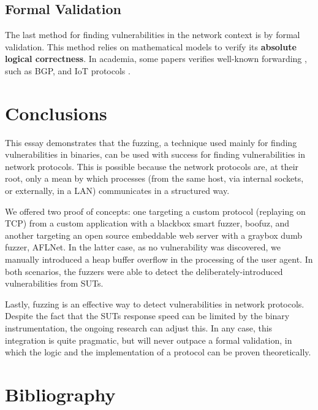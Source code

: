 \documentclass[10pt,a4paper,english,onecolumn]{IEEEtran}
\begin{document}
\subsection{Formal Validation}

The last method for finding vulnerabilities in the network context is by formal validation. This method relies on mathematical models to verify its \textbf{absolute logical correctness}. In academia, some papers verifies well-known forwarding \cite{formal_verification_bgp}, such as BGP, and IoT protocols \cite{formal_verification_iot}.

\section{Conclusions}

This essay demonstrates that the fuzzing, a technique used mainly for finding vulnerabilities in binaries, can be used with success for finding vulnerabilities in network protocols. This is possible because the network protocols are, at their root, only a mean by which processes (from the same host, via internal sockets, or externally, in a LAN) communicates in a structured way.

We offered two proof of concepts: one targeting a custom protocol (replaying on TCP) from a custom application with a blackbox smart fuzzer, boofuz, and another targeting an open source embeddable web server with a graybox dumb fuzzer, AFLNet. In the latter case, as no vulnerability was discovered, we manually introduced a heap buffer overflow in the processing of the user agent. In both scenarios, the fuzzers were able to detect the deliberately-introduced vulnerabilities from SUTs.

Lastly, fuzzing is an effective  way to detect vulnerabilities in network protocols. Despite the fact that the SUTs response speed can be limited by the binary instrumentation, the ongoing research can adjust this. In any case, this integration is quite pragmatic, but will never outpace a formal validation, in which the logic and the implementation of a protocol can be proven theoretically.

\section{Bibliography}
\nocite{*}
\printbibliography[heading=none]
\end{document}
